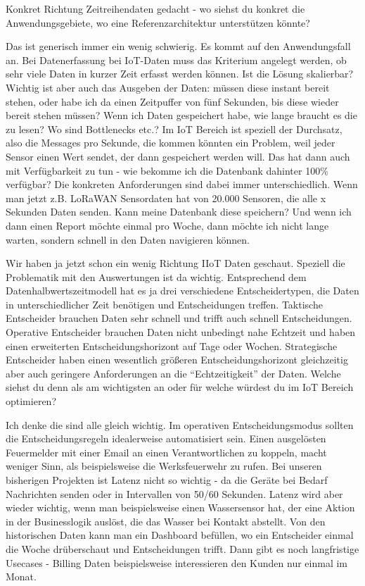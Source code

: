 \LF Konkret Richtung Zeitreihendaten gedacht - wo siehst du konkret die Anwendungsgebiete, wo eine Referenzarchitektur unterstützen könnte?

\RB Das ist generisch immer ein wenig schwierig. Es kommt auf den Anwendungsfall an. Bei Datenerfassung bei \ac{IoT}-Daten muss das Kriterium angelegt werden, ob sehr viele Daten in kurzer Zeit erfasst werden können. Ist die Lösung skalierbar? Wichtig ist aber auch das Ausgeben der Daten: müssen diese instant bereit stehen, oder habe ich da einen Zeitpuffer von fünf Sekunden, bis diese wieder bereit stehen müssen? Wenn ich Daten gespeichert habe, wie lange braucht es die zu lesen? Wo sind Bottlenecks etc.? Im \ac{IoT} Bereich ist speziell der Durchsatz, also die Messages pro Sekunde, die kommen könnten ein Problem, weil jeder Sensor einen Wert sendet, der dann gespeichert werden will. Das hat dann auch mit Verfügbarkeit zu tun - wie bekomme ich die Datenbank dahinter 100\% verfügbar? Die konkreten Anforderungen sind dabei immer unterschiedlich. Wenn man jetzt z.B. \ac{LoRaWAN} Sensordaten hat von 20.000 Sensoren, die alle x Sekunden Daten senden. Kann meine Datenbank diese speichern? Und wenn ich dann einen Report möchte einmal pro Woche, dann möchte ich nicht lange warten, sondern schnell in den Daten navigieren können.

\LF Wir haben ja jetzt schon ein wenig Richtung \ac{IIoT} Daten geschaut. Speziell die Problematik mit den Auswertungen ist da wichtig. Entsprechend dem Datenhalbwertszeitmodell hat es ja drei verschiedene Entscheidertypen, die Daten in unterschiedlicher Zeit benötigen und Entscheidungen treffen. Taktische Entscheider brauchen Daten sehr schnell und trifft auch schnell Entscheidungen. Operative Entscheider brauchen Daten nicht unbedingt nahe Echtzeit und haben einen erweiterten Entscheidungshorizont auf Tage oder Wochen. Strategische Entscheider haben einen wesentlich größeren Entscheidungshorizont gleichzeitig aber auch geringere Anforderungen an die \enquote{Echtzeitigkeit} der Daten. Welche siehst du denn als am wichtigsten an oder für welche würdest du im \ac{IoT} Bereich optimieren?

\RB Ich denke die sind alle gleich wichtig. Im operativen Entscheidungsmodus sollten die Entscheidungsregeln idealerweise automatisiert sein. Einen ausgelösten Feuermelder mit einer Email an einen Verantwortlichen zu koppeln, macht weniger Sinn, als beispielsweise die Werksfeuerwehr zu rufen. Bei unseren bisherigen Projekten ist Latenz nicht so wichtig - da die Geräte bei Bedarf Nachrichten senden oder in Intervallen von 50/60 Sekunden. Latenz wird aber wieder wichtig, wenn man beispielsweise einen Wassersensor hat, der eine Aktion in der Businesslogik auslöst, die das Wasser bei Kontakt abstellt. Von den historischen Daten kann man ein Dashboard befüllen, wo ein Entscheider einmal die Woche drüberschaut und Entscheidungen trifft. Dann gibt es noch langfristige Usecases - Billing Daten beispielsweise interessieren den Kunden nur einmal im Monat.

